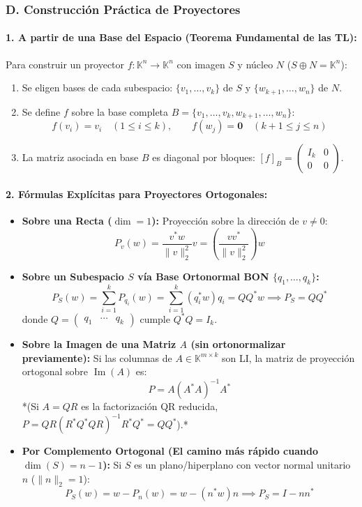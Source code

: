\documentclass[11pt,a4paper]{article}
\begin{document}
\subsubsection*{D. Construcción Práctica de Proyectores}

\paragraph{1. A partir de una Base del Espacio (Teorema Fundamental de las TL):}
Para construir un proyector $f: \mathbb{K}^n \to \mathbb{K}^n$ con imagen $S$ y núcleo $N$ ($S \oplus N = \mathbb{K}^n$):
\begin{enumerate}
    \item Se eligen bases de cada subespacio: $\{v_1, \dots, v_k\}$ de $S$ y $\{w_{k+1}, \dots, w_n\}$ de $N$.
    \item Se define $f$ sobre la base completa $B = \{v_1, \dots, v_k, w_{k+1}, \dots, w_n\}$:
    \[
    f(v_i) = v_i \quad (1 \le i \le k), \qquad f(w_j) = \mathbf{0} \quad (k+1 \le j \le n)
    \]
    \item La matriz asociada en base $B$ es diagonal por bloques: $[f]_B = \begin{pmatrix} I_k & 0 \\ 0 & 0 \end{pmatrix}$.
\end{enumerate}

\paragraph{2. Fórmulas Explícitas para Proyectores Ortogonales:}
\begin{itemize}
    \item \textbf{Sobre una Recta ($\dim = 1$):} Proyección sobre la dirección de $v \neq 0$:
    \[
    P_v(w) = \frac{v^* w}{\|v\|_2^2} v = \left( \frac{v v^*}{\|v\|_2^2} \right) w
    \]
    \item \textbf{Sobre un Subespacio $S$ vía Base Ortonormal BON $\{q_1, \dots, q_k\}$:}
    \[
    P_S(w) = \sum_{i=1}^k P_{q_i}(w) = \sum_{i=1}^k (q_i^* w) q_i = Q Q^* w \implies P_S = Q Q^*
    \]
    donde $Q = \begin{pmatrix} q_1 & \cdots & q_k \end{pmatrix}$ cumple $Q^* Q = I_k$.
    \item \textbf{Sobre la Imagen de una Matriz $A$ (sin ortonormalizar previamente):}
    Si las columnas de $A \in \mathbb{K}^{m \times k}$ son LI, la matriz de proyección ortogonal sobre $\operatorname{Im}(A)$ es:
    \[
    P = A (A^* A)^{-1} A^*
    \]
    *(Si $A = QR$ es la factorización QR reducida, $P = QR(R^* Q^* Q R)^{-1} R^* Q^* = Q Q^*$).*
    \item \textbf{Por Complemento Ortogonal (El camino más rápido cuando $\dim(S) = n - 1$):}
    Si $S$ es un plano/hiperplano con vector normal unitario $n$ ($\|n\|_2 = 1$):
    \[
    P_S(w) = w - P_n(w) = w - (n^* w) n \implies P_S = I - n n^*
    \]
\end{itemize}
\end{document}
